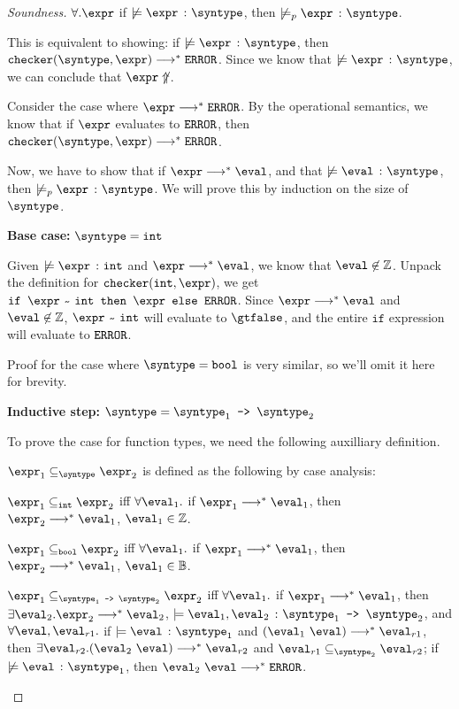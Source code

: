 \begin{proof}[Soundness]
  $\forall. \expr$ if $\not\models \hastype{\expr}{\syntype}$, then $\not\models_p \hastype{\expr}{\syntype}$.

  This is equivalent to showing: if $\not\models \hastype{\expr}{\syntype}$, then $\mkche{\syntype}{\expr} \smallsteps[] \eerror$. Since we know that $\not \models \hastype{\expr}{\syntype}$, we can conclude that $\expr \not\Uparrow$. 

  Consider the case where $\expr \smallsteps[] \eerror$. By the operational semantics, we know that if $\expr$ evaluates to $\texttt{ERROR}$, then $\mkche{\syntype}{\expr} \smallsteps[] \eerror$.

  Now, we have to show that if $\expr \smallsteps[] \eval$, and that $\not \models \hastype{\eval}{\syntype}$, then $\not\models_p \hastype{\expr}{\syntype}$. We will prove this by induction on the size of $\syntype$.

  \textbf{Base case: }$\syntype = \tint$

  Given $\not \models \hastype{\expr}{\tint}$ and $\expr \smallsteps[] \eval$, we know that $\eval \not\in \mathbb{Z}$. Unpack the definition for $\mkche{\tint}{\expr}$, we get $\ife{\matches{\expr}{\tint}}{\expr}{\eerror}$. Since $\expr \smallsteps[] \eval$ and $\eval \not\in \mathbb{Z}$, $\matches{\expr}{\tint}$ will evaluate to $\gtfalse$, and the entire $\texttt{if}$ expression will evaluate to $\texttt{ERROR}$.

  Proof for the case where $\syntype = \tbool$ is very similar, so we'll omit it here for brevity.

  \textbf{Inductive step: }$\syntype = \mkfun{\syntype_1}{\syntype_2}$

  To prove the case for function types, we need the following auxilliary definition.

  \begin{definition}
    $\expr_1 \subseteq_{\syntype} \expr_2$ is defined as the following by case analysis:

    $\expr_1 \subseteq_{\tint} \expr_2$ iff $\forall \eval_1.$ if $\expr_1 \smallsteps[] \eval_1$, then $\expr_2 \smallsteps[] \eval_1$, $\eval_1 \in \mathbb{Z}$.

    $\expr_1 \subseteq_{\tbool} \expr_2$ iff $\forall \eval_1.$ if $\expr_1 \smallsteps[] \eval_1$, then $\expr_2 \smallsteps[] \eval_1$, $\eval_1 \in \mathbb{B}$.

    $\expr_1 \subseteq_{\mkfun{\syntype_1}{\syntype_2}} \expr_2$ iff $\forall \eval_1.$ if $\expr_1 \smallsteps[] \eval_1$, then $\exists \eval_2. \expr_2 \smallsteps[] \eval_2$, $\models \hastype{\eval_1, \eval_2}{\mkfun{\syntype_1}{\syntype_2}}$, and $\forall \eval, \eval_{r1}.$ if $\models \hastype{\eval}{\syntype_1}$ and $(\eval_1 \ \eval) \smallsteps[] \eval_{r1}$, then $\exists \eval_{r2}. (\eval_2 \ \eval) \smallsteps[] \eval_{r2}$ and $\eval_{r1} \subseteq_{\syntype_2} \eval_{r2}$; if $\not\models \hastype{\eval}{\syntype_1}$, then $\eval_2 \ \eval \smallsteps[] \eerror$.


\end{definition}
\end{proof}
